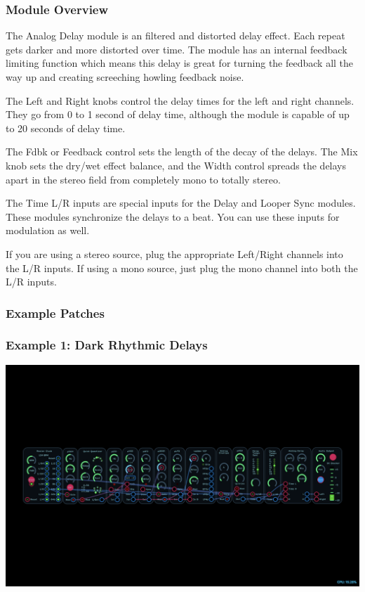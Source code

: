 \documentclass[11pt]{book}
\begin{document}
\pagebreak

\begin{multicols*}{2}

\subsubsection*{Module Overview}

The Analog Delay module is an filtered and distorted delay effect. Each repeat gets darker and more distorted over time. The module has an internal feedback limiting function which means this delay is great for turning the feedback all the way up and creating screeching howling feedback noise.

The Left and Right knobs control the delay times for the left and right channels. They go from 0 to 1 second of delay time, although the module is capable of up to 20 seconds of delay time.

The Fdbk or Feedback control sets the length of the decay of the delays. The Mix knob sets the dry/wet effect balance, and the Width control spreads the delays apart in the stereo field from completely mono to totally stereo.

The Time L/R inputs are special inputs for the Delay and Looper Sync modules. These modules synchronize the delays to a beat. You can use these inputs for modulation as well.

If you are using a stereo source, plug the appropriate Left/Right channels into the L/R inputs. If using a mono source, just plug the mono channel into both the L/R inputs.

\subsubsection*{Example Patches}

\subsubsection*{Example 1: Dark Rhythmic Delays}

\begin{center}
\includegraphics[width=0.95\linewidth]{analog-delay-fig1.png}
\end{center}


\end{multicols*}
\end{document}
